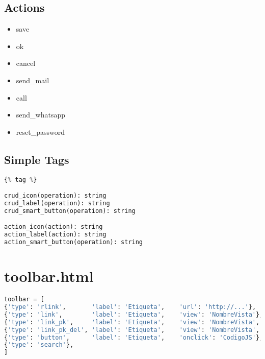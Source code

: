 \subsection{Actions}

\begin{itemize}
	\item save
	\item ok
	\item cancel
	\item send\_mail
	\item call
	\item send\_whatsapp
	\item reset\_password
\end{itemize}

\subsection{Simple Tags}

\begin{lstlisting}[language=Python]
{% tag %}

crud_icon(operation): string
crud_label(operation): string
crud_smart_button(operation): string

action_icon(action): string
action_label(action): string
action_smart_button(operation): string
\end{lstlisting}

\section{toolbar.html}

\begin{lstlisting}[language=Python]
toolbar = [
{'type': 'rlink',       'label': 'Etiqueta',    'url': 'http://...'},
{'type': 'link',        'label': 'Etiqueta',    'view': 'NombreVista'},
{'type': 'link_pk',     'label': 'Etiqueta',    'view': 'NombreVista',  pk: 'Valor'},
{'type': 'link_pk_del', 'label': 'Etiqueta',    'view': 'NombreVista',  pk: 'Valor'},
{'type': 'button',      'label': 'Etiqueta',    'onclick': 'CodigoJS'},
{'type': 'search'},
]
\end{lstlisting}
